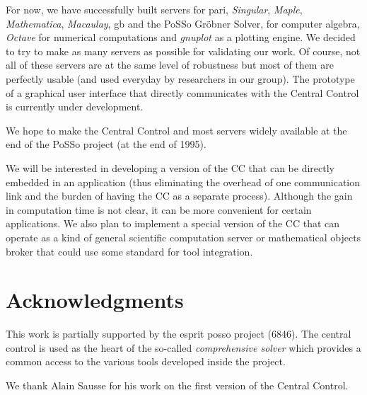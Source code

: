 \documentclass {article}
\begin{document}
For now, we have successfully built servers for {\sc pari}, 
{\sl Singular}, {\sl Maple}, {\sl Mathematica}, {\sl Macaulay}, {\sc gb} and
the PoSSo Gr\"obner Solver, for computer algebra, 
{\sl Octave} for numerical computations 
and {\sl gnuplot} as a plotting engine. 
We decided to try to make as many servers as possible for validating our work.
Of course, not all of these servers are at the same level of robustness but
most of them are perfectly usable (and used everyday by researchers in our
group). 
The prototype of a graphical user interface that directly communicates with
the Central Control is currently under development.

We hope to make the Central Control and most servers widely available at the
end of the PoSSo project (at the end of 1995).

We will be interested in developing a version of the CC that can be directly
embedded  in an application (thus eliminating the overhead of one
communication link and the burden of having the CC as a separate
process). Although the gain in computation time is not clear, it can be more
convenient for certain applications. 
We also plan to implement a special version of the CC that can operate as a
kind of general scientific computation server or mathematical objects broker
that could use some standard for tool integration.

\section* {Acknowledgments} 

This work is partially supported by the {\sc esprit} {\sc posso} project 
(6846). The central control is used as the heart of the so-called {\em
comprehensive solver\/} which  provides a common access to the various
tools developed inside the project.

We thank Alain Sausse for his work on the first version of the Central
Control. 
\end{document}
